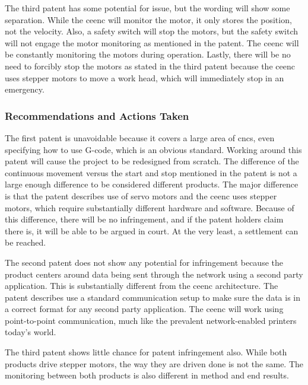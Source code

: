 The third patent has some potential for issue, but the wording will show some separation. 
While the \gls{ceenc} will monitor the motor, it only stores the position, not the velocity.
Also, a safety switch will stop the motors, but the safety switch will not engage the motor monitoring as mentioned in the patent. 
The \gls{ceenc} will be constantly monitoring the motors during operation.
Lastly, there will be no need to forcibly stop the motors as stated in the third patent because the \gls{ceenc} uses stepper motors to move a work head, which will immediately stop in an emergency.

\subsubsection{Recommendations and Actions Taken}
The first patent is unavoidable because it covers a large area of \gls{cnc}s, even specifying how to use G-code, which is an obvious standard.
Working around this patent will cause the project to be redesigned from scratch.
The difference of the continuous movement versus the start and stop mentioned in the patent is not a large enough difference to be considered different products.
The major difference is that the patent describes use of servo motors and the \gls{ceenc} uses stepper motors, which require substantially different hardware and software.
Because of this difference, there will be no infringement, and if the patent holders claim there is, it will be able to be argued in court. 
At the very least, a settlement can be reached.

The second patent does not show any potential for infringement because the product centers around data being sent through the network using a second party application.
This is substantially different from the \gls{ceenc} architecture.
The patent describes use a standard communication setup to make sure the data is in a correct format for any second party application.
The \gls{ceenc} will work using point-to-point communication, much like the prevalent network-enabled printers today’s world.

The third patent shows little chance for patent infringement also.
While both products drive stepper motors, the way they are driven done is not the same.
The monitoring between both products is also different in method and end results.
